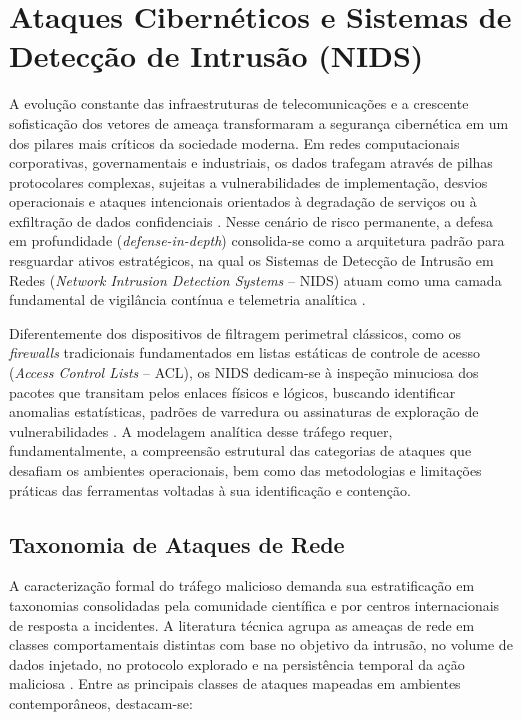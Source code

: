 \section{Ataques Cibernéticos e Sistemas de Detecção de Intrusão (NIDS)}
\label{sec:ataques_e_nids}

A evolução constante das infraestruturas de telecomunicações e a crescente sofisticação dos vetores de ameaça transformaram a segurança cibernética em um dos pilares mais críticos da sociedade moderna. Em redes computacionais corporativas, governamentais e industriais, os dados trafegam através de pilhas protocolares complexas, sujeitas a vulnerabilidades de implementação, desvios operacionais e ataques intencionais orientados à degradação de serviços ou à exfiltração de dados confidenciais \cite{cyberrisk2025, aiimpact2026}. Nesse cenário de risco permanente, a defesa em profundidade (\emph{defense-in-depth}) consolida-se como a arquitetura padrão para resguardar ativos estratégicos, na qual os Sistemas de Detecção de Intrusão em Redes (\emph{Network Intrusion Detection Systems} -- NIDS) atuam como uma camada fundamental de vigilância contínua e telemetria analítica \cite{advancedids2024, p4nids2025}.

Diferentemente dos dispositivos de filtragem perimetral clássicos, como os \emph{firewalls} tradicionais fundamentados em listas estáticas de controle de acesso (\emph{Access Control Lists} -- ACL), os NIDS dedicam-se à inspeção minuciosa dos pacotes que transitam pelos enlaces físicos e lógicos, buscando identificar anomalias estatísticas, padrões de varredura ou assinaturas de exploração de vulnerabilidades \cite{standard2021}. A modelagem analítica desse tráfego requer, fundamentalmente, a compreensão estrutural das categorias de ataques que desafiam os ambientes operacionais, bem como das metodologias e limitações práticas das ferramentas voltadas à sua identificação e contenção.

\subsection{Taxonomia de Ataques de Rede}
\label{subsec:taxonomia_ataques}

A caracterização formal do tráfego malicioso demanda sua estratificação em taxonomias consolidadas pela comunidade científica e por centros internacionais de resposta a incidentes. A literatura técnica agrupa as ameaças de rede em classes comportamentais distintas com base no objetivo da intrusão, no volume de dados injetado, no protocolo explorado e na persistência temporal da ação maliciosa \cite{Sharafaldin2018TowardGA, standard2021, ciciot2023}. Entre as principais classes de ataques mapeadas em ambientes contemporâneos, destacam-se:

